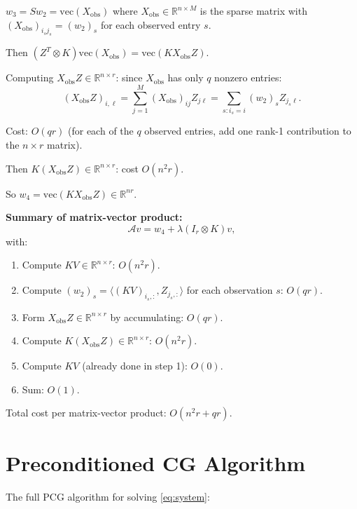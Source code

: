 \documentclass[12pt]{article}
\begin{document}
$w_3 = Sw_2 = \mathrm{vec}(X_{\mathrm{obs}})$ where $X_{\mathrm{obs}} \in \mathbb{R}^{n \times M}$ is the sparse matrix with $(X_{\mathrm{obs}})_{i_s j_s} = (w_2)_s$ for each observed entry $s$.

Then $(Z^T \otimes K)\mathrm{vec}(X_{\mathrm{obs}}) = \mathrm{vec}(K X_{\mathrm{obs}} Z)$.

Computing $X_{\mathrm{obs}} Z \in \mathbb{R}^{n \times r}$: since $X_{\mathrm{obs}}$ has only $q$ nonzero entries:
\[
(X_{\mathrm{obs}} Z)_{i, \ell} = \sum_{j=1}^M (X_{\mathrm{obs}})_{ij} Z_{j\ell} = \sum_{s: i_s = i} (w_2)_s Z_{j_s \ell}.
\]

Cost: $O(qr)$ (for each of the $q$ observed entries, add one rank-1 contribution to the $n \times r$ matrix).

Then $K(X_{\mathrm{obs}} Z) \in \mathbb{R}^{n \times r}$: cost $O(n^2 r)$.

So $w_4 = \mathrm{vec}(K X_{\mathrm{obs}} Z) \in \mathbb{R}^{nr}$.

\textbf{Summary of matrix-vector product:}
\[
\mathcal{A}v = w_4 + \lambda(I_r \otimes K)v,
\]
with:
\begin{enumerate}
\item Compute $KV \in \mathbb{R}^{n \times r}$: $O(n^2 r)$.
\item Compute $(w_2)_s = \langle (KV)_{i_s,:}, Z_{j_s,:}\rangle$ for each observation $s$: $O(qr)$.
\item Form $X_{\mathrm{obs}} Z \in \mathbb{R}^{n\times r}$ by accumulating: $O(qr)$.
\item Compute $K(X_{\mathrm{obs}}Z) \in \mathbb{R}^{n\times r}$: $O(n^2 r)$.
\item Compute $K V$ (already done in step 1): $O(0)$.
\item Sum: $O(1)$.
\end{enumerate}

Total cost per matrix-vector product: $O(n^2 r + qr)$.

\section{Preconditioned CG Algorithm}

The full PCG algorithm for solving \eqref{eq:system}:
\end{document}
